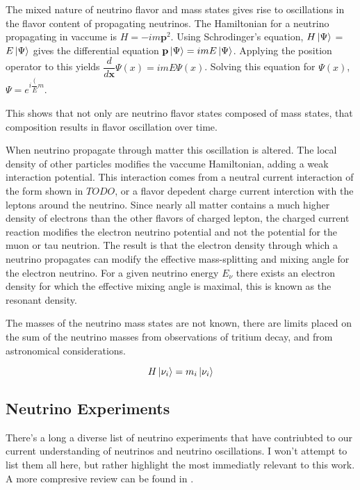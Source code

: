 The mixed nature of neutrino flavor and mass states gives rise to oscillations
in the flavor content of propagating neutrinos.
The Hamiltonian for a neutrino propagating in vaccume is
$H = -im\textbf{p}^2 $.
Using Schrodinger's equation,
$H\ket{\Psi}$ = $E\ket{\Psi}$
gives the differential equation
$\textbf{p} \ket{\Psi} = imE\ket{\Psi}$.
Applying the position operator to this yields
$\dfrac{d}{d\textbf{x}} \Psi(x) = imE\Psi(x)$.
Solving this equation for $\Psi(x)$,
$\Psi = e^{i\dfrac({E}{m}}$.

This shows that not only are neutrino flavor states
composed of mass states, that composition results
in flavor oscillation over time.

When neutrino propagate through matter this oscillation is altered.
The local density of other particles modifies the vaccume Hamiltonian,
adding a weak interaction potential.
This interaction comes from a neutral current interaction of the form
shown in $TODO$, or a flavor depedent charge current interction with the
leptons around the neutrino.
Since nearly all matter contains a much higher density of electrons
than the other flavors of charged lepton, the charged current reaction
modifies the electron neutrino potential and not the potential for the muon
or tau neutrion.
The result is that the electron density through which a neutrino propagates
can modify the effective mass-splitting and mixing angle for the electron
neutrino.
For a given neutrino energy $E_{\nu}$ there exists an electron density for which
the effective mixing angle is maximal, this is known as the resonant density.

The masses of the neutrino mass states are not known, there are limits placed
on the sum of the neutrino masses from observations of tritium decay, and
from astronomical considerations. %


\begin{equation}
    H \ket{\nu_i} = m_i \ket{\nu_i}
\end{equation}


\subsection{Neutrino Experiments}
There's a long a diverse list of neutrino experiments that have contriubted to
our current understanding of neutrinos and neutrino oscillations.
I won't attempt to list them all here, but rather highlight the most immediatly
relevant to this work. A more compresive review can be found in \citep{FINDAREVIEW}.

